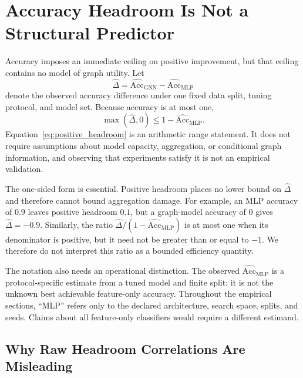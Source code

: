 
\section{Accuracy Headroom Is Not a Structural Predictor}
\label{sec:budget}

Accuracy imposes an immediate ceiling on positive improvement, but that ceiling contains no model of graph utility. Let
\begin{equation}
    \widehat{\Delta}
    = \widehat{\mathrm{Acc}}_{\mathrm{GNN}}
    - \widehat{\mathrm{Acc}}_{\mathrm{MLP}}
\end{equation}
denote the observed accuracy difference under one fixed data split, tuning protocol, and model set. Because accuracy is at most one,
\begin{equation}
    \max(\widehat{\Delta},0)
    \leq 1-\widehat{\mathrm{Acc}}_{\mathrm{MLP}}.
    \label{eq:positive_headroom}
\end{equation}
Equation~\eqref{eq:positive_headroom} is an arithmetic range statement. It does not require assumptions about model capacity, aggregation, or conditional graph information, and observing that experiments satisfy it is not an empirical validation.

The one-sided form is essential. Positive headroom places no lower bound on $\widehat{\Delta}$ and therefore cannot bound aggregation damage. For example, an MLP accuracy of $0.9$ leaves positive headroom $0.1$, but a graph-model accuracy of $0$ gives $\widehat{\Delta}=-0.9$. Similarly, the ratio $\widehat{\Delta}/(1-\widehat{\mathrm{Acc}}_{\mathrm{MLP}})$ is at most one when its denominator is positive, but it need not be greater than or equal to $-1$. We therefore do not interpret this ratio as a bounded efficiency quantity.

The notation also needs an operational distinction. The observed $\widehat{\mathrm{Acc}}_{\mathrm{MLP}}$ is a protocol-specific estimate from a tuned model and finite split; it is not the unknown best achievable feature-only accuracy. Throughout the empirical sections, ``MLP'' refers only to the declared architecture, search space, splits, and seeds. Claims about all feature-only classifiers would require a different estimand.

\subsection{Why Raw Headroom Correlations Are Misleading}

